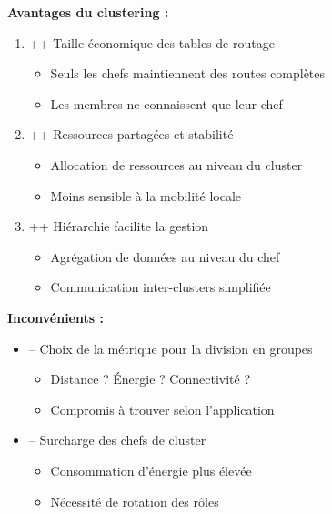 \documentclass[12pt,a4paper]{article}
\begin{document}
\begin{astuce}
\textbf{Avantages du clustering :}

\begin{enumerate}
    \item \textcolor{defvert}{++} Taille économique des tables de routage
    \begin{itemize}
        \item Seuls les chefs maintiennent des routes complètes
        \item Les membres ne connaissent que leur chef
    \end{itemize}
    
    \item \textcolor{defvert}{++} Ressources partagées et stabilité
    \begin{itemize}
        \item Allocation de ressources au niveau du cluster
        \item Moins sensible à la mobilité locale
    \end{itemize}
    
    \item \textcolor{defvert}{++} Hiérarchie facilite la gestion
    \begin{itemize}
        \item Agrégation de données au niveau du chef
        \item Communication inter-clusters simplifiée
    \end{itemize}
\end{enumerate}

\textbf{Inconvénients :}

\begin{itemize}
    \item \textcolor{importantrouge}{--} Choix de la métrique pour la division en groupes
    \begin{itemize}
        \item Distance ? Énergie ? Connectivité ?
        \item Compromis à trouver selon l'application
    \end{itemize}
    
    \item \textcolor{importantrouge}{--} Surcharge des chefs de cluster
    \begin{itemize}
        \item Consommation d'énergie plus élevée
        \item Nécessité de rotation des rôles
    \end{itemize}
\end{itemize}
\end{astuce}
\end{document}
